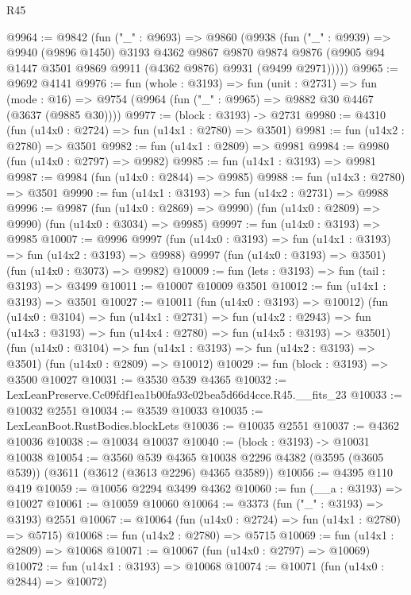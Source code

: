\begin{lexlean}{R45}
\begin{coremodule}
@9964 := @9842
    (fun ("_" : @9693) =>
    @9860
      (@9938
        (fun ("_" : @9939) =>
        @9940
          (@9896 @1450)
          @3193
          @4362
          @9867
          @9870
          @9874
          @9876
          (@9905 @94 @1447 @3501 @9869 @9911 (@4362 @9876) @9931 (@9499 @2971)))))
@9965 := @9692 @4141
@9976 := fun (whole : @3193) =>
  fun (unit : @2731) =>
  fun (mode : @16) => @9754 (@9964 (fun ("_" : @9965) => @9882 @30 @4467 (@3637 (@9885 @30))))
@9977 := (block : @3193) -> @2731
@9980 := @4310 (fun (u14x0 : @2724) => fun (u14x1 : @2780) => @3501)
@9981 := fun (u14x2 : @2780) => @3501
@9982 := fun (u14x1 : @2809) => @9981
@9984 := @9980 (fun (u14x0 : @2797) => @9982)
@9985 := fun (u14x1 : @3193) => @9981
@9987 := @9984 (fun (u14x0 : @2844) => @9985)
@9988 := fun (u14x3 : @2780) => @3501
@9990 := fun (u14x1 : @3193) => fun (u14x2 : @2731) => @9988
@9996 := @9987
    (fun (u14x0 : @2869) => @9990)
    (fun (u14x0 : @2809) => @9990)
    (fun (u14x0 : @3034) => @9985)
@9997 := fun (u14x0 : @3193) => @9985
@10007 := @9996
    @9997
    (fun (u14x0 : @3193) => fun (u14x1 : @3193) => fun (u14x2 : @3193) => @9988)
    @9997
    (fun (u14x0 : @3193) => @3501)
    (fun (u14x0 : @3073) => @9982)
@10009 := fun (lets : @3193) => fun (tail : @3193) => @3499
@10011 := @10007 @10009 @3501
@10012 := fun (u14x1 : @3193) => @3501
@10027 := @10011
    (fun (u14x0 : @3193) => @10012)
    (fun (u14x0 : @3104) =>
    fun (u14x1 : @2731) =>
    fun (u14x2 : @2943) =>
    fun (u14x3 : @3193) => fun (u14x4 : @2780) => fun (u14x5 : @3193) => @3501)
    (fun (u14x0 : @3104) => fun (u14x1 : @3193) => fun (u14x2 : @3193) => @3501)
    (fun (u14x0 : @2809) => @10012)
@10029 := fun (block : @3193) => @3500 @10027
@10031 := @3530 @539 @4365
@10032 := LexLeanPreserve.Cc09fdf1ea1b00fa93c02bea5d66d4cce.R45.__fits_23
@10033 := @10032 @2551
@10034 := @3539 @10033
@10035 := LexLeanBoot.RustBodies.blockLets
@10036 := @10035 @2551
@10037 := @4362 @10036
@10038 := @10034 @10037
@10040 := (block : @3193) -> @10031 @10038
@10054 := @3560
    @539
    @4365
    @10038
    @2296
    @4382
    (@3595 (@3605 @539))
    (@3611 (@3612 (@3613 @2296) @4365 @3589))
@10056 := @4395 @110 @419
@10059 := @10056 @2294 @3499 @4362
@10060 := fun (__a : @3193) => @10027
@10061 := @10059 @10060
@10064 := @3373 (fun ("_" : @3193) => @3193) @2551
@10067 := @10064 (fun (u14x0 : @2724) => fun (u14x1 : @2780) => @5715)
@10068 := fun (u14x2 : @2780) => @5715
@10069 := fun (u14x1 : @2809) => @10068
@10071 := @10067 (fun (u14x0 : @2797) => @10069)
@10072 := fun (u14x1 : @3193) => @10068
@10074 := @10071 (fun (u14x0 : @2844) => @10072)

\end{coremodule}
\end{lexlean}
